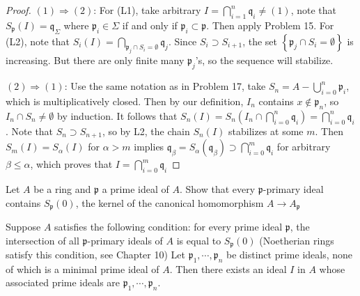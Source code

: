 \documentclass{solution}
\begin{document}
\begin{proof}
    $(1) \Rightarrow (2)$: For (L1), take arbitrary $I = \bigcap\limits_{i = 1}^{n} \mathfrak{q}_i \ne (1)$, note that $S_{\mathfrak{p}}(I) = \mathfrak{q}_{\Sigma}$ where $\mathfrak{p}_i \in \Sigma$ if and only if $\mathfrak{p}_i \subset \mathfrak{p}$. Then apply Problem 15. For (L2), note that $S_i(I) = \bigcap\limits_{\mathfrak{p}_j \cap S_i = \emptyset} \mathfrak{q}_j$. Since $S_i \supset S_{i + 1}$, the set $\left\lbrace \mathfrak{p}_j \cap S_i = \emptyset \right\rbrace$ is increasing. But there are only finite many $\mathfrak{p}_j$'s, so the sequence will stabilize.

    $(2) \Rightarrow (1)$: Use the same notation as in Problem 17, take $S_n = A - \bigcup\limits_{i = 0}^{n} \mathfrak{p}_i$, which is multiplicatively closed. Then by our definition, $I_{n}$ contains $x \notin \mathfrak{p}_n$, so $I_n \cap S_n \ne \emptyset$ by induction. It follows that $S_n(I) = S_n(I_n \cap \bigcap\limits_{i = 0}^{n} \mathfrak{q}_i) = \bigcap\limits_{i = 0}^{n} \mathfrak{q}_i$. Note that $S_n \supset S_{n + 1}$, so by L2, the chain $S_n(I)$ stabilizes at some $m$. Then $S_m(I) = S_{\alpha}(I)$ for $\alpha \gt m$ implies $\mathfrak{q}_{\beta} = S_{\alpha}(\mathfrak{q}_{\beta}) \supset \bigcap\limits_{i = 0}^{m} \mathfrak{q}_i$ for arbitrary $\beta \le \alpha$, which proves that $I = \bigcap\limits_{i = 0}^{m} \mathfrak{q}_i$
\end{proof}

\begin{problem}
    Let $A$ be a ring and $\mathfrak{p}$ a prime ideal of $A$. Show that every $\mathfrak{p}$-primary ideal contains $S_{\mathfrak{p}}(0)$, the kernel of the canonical homomorphism $A \rightarrow A_{\mathfrak{p}}$

    Suppose $A$ satisfies the following condition: for every prime ideal $\mathfrak{p}$, the intersection of all $\mathfrak{p}$-primary ideals of $A$ is equal to $S_{\mathfrak{p}}(0)$ (Noetherian rings satisfy this condition, see Chapter 10) Let $\mathfrak{p}_1, \cdots, \mathfrak{p}_n$ be distinct prime ideals, none of which is a minimal prime ideal of $A$. Then there exists an ideal $I$ in $A$ whose associated prime ideals are $\mathfrak{p}_1, \cdots, \mathfrak{p}_n$.
\end{problem}
\end{document}
